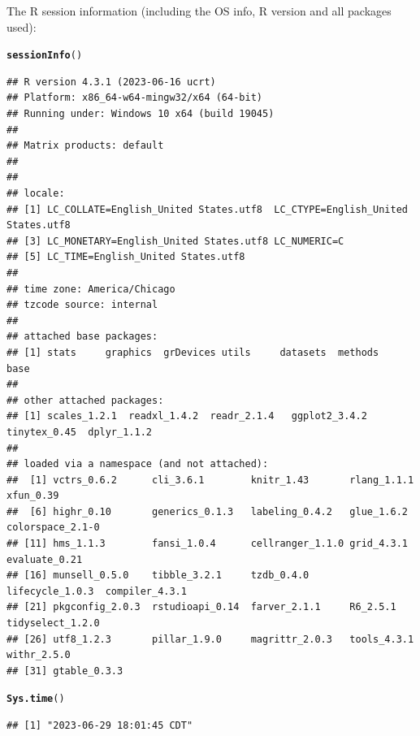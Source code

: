 \documentclass{article}\usepackage[]{graphicx}\usepackage[]{xcolor}
\makeatletter
\newcommand{\hlstd}[1]{\textcolor[rgb]{0.345,0.345,0.345}{#1}}%
\newcommand{\hlkwd}[1]{\textcolor[rgb]{0.737,0.353,0.396}{\textbf{#1}}}%
\newenvironment{kframe}{%
 \def\at@end@of@kframe{}%
 \ifinner\ifhmode%
  \def\at@end@of@kframe{\end{minipage}}%
  \begin{minipage}{\columnwidth}%
 \fi\fi%
 \def\FrameCommand##1{\hskip\@totalleftmargin \hskip-\fboxsep
 \colorbox{shadecolor}{##1}\hskip-\fboxsep
     \hskip-\linewidth \hskip-\@totalleftmargin \hskip\columnwidth}%
 \MakeFramed {\advance\hsize-\width
   \@totalleftmargin\z@ \linewidth\hsize
   \@setminipage}}%
 {\par\unskip\endMakeFramed%
 \at@end@of@kframe}
\newenvironment{knitrout}{}{} %
\makeatother
\begin{document}
The R session information (including the OS info, R version and all
packages used):

\begin{knitrout}
\color{fgcolor}\begin{kframe}
\begin{alltt}
\hlkwd{sessionInfo}\hlstd{()}
\end{alltt}
\begin{verbatim}
## R version 4.3.1 (2023-06-16 ucrt)
## Platform: x86_64-w64-mingw32/x64 (64-bit)
## Running under: Windows 10 x64 (build 19045)
## 
## Matrix products: default
## 
## 
## locale:
## [1] LC_COLLATE=English_United States.utf8  LC_CTYPE=English_United States.utf8   
## [3] LC_MONETARY=English_United States.utf8 LC_NUMERIC=C                          
## [5] LC_TIME=English_United States.utf8    
## 
## time zone: America/Chicago
## tzcode source: internal
## 
## attached base packages:
## [1] stats     graphics  grDevices utils     datasets  methods   base     
## 
## other attached packages:
## [1] scales_1.2.1  readxl_1.4.2  readr_2.1.4   ggplot2_3.4.2 tinytex_0.45  dplyr_1.1.2  
## 
## loaded via a namespace (and not attached):
##  [1] vctrs_0.6.2      cli_3.6.1        knitr_1.43       rlang_1.1.1      xfun_0.39       
##  [6] highr_0.10       generics_0.1.3   labeling_0.4.2   glue_1.6.2       colorspace_2.1-0
## [11] hms_1.1.3        fansi_1.0.4      cellranger_1.1.0 grid_4.3.1       evaluate_0.21   
## [16] munsell_0.5.0    tibble_3.2.1     tzdb_0.4.0       lifecycle_1.0.3  compiler_4.3.1  
## [21] pkgconfig_2.0.3  rstudioapi_0.14  farver_2.1.1     R6_2.5.1         tidyselect_1.2.0
## [26] utf8_1.2.3       pillar_1.9.0     magrittr_2.0.3   tools_4.3.1      withr_2.5.0     
## [31] gtable_0.3.3
\end{verbatim}
\begin{alltt}
\hlkwd{Sys.time}\hlstd{()}
\end{alltt}
\begin{verbatim}
## [1] "2023-06-29 18:01:45 CDT"
\end{verbatim}
\end{kframe}
\end{knitrout}
\end{document}
